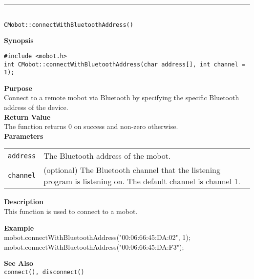 \noindent
\vspace{5pt}
\rule{4.5in}{0.015in} \\
\noindent
{\LARGE \texttt{CMobot::connectWithBluetoothAddress()}}\\
{}

\noindent
{\bf Synopsis}
\vspace{-8pt}
\begin{verbatim}
#include <mobot.h>
int CMobot::connectWithBluetoothAddress(char address[], int channel = 1);
\end{verbatim}

\noindent
{\bf Purpose}\\
Connect to a remote mobot via Bluetooth by specifying the specific Bluetooth
address of the device.\\

\noindent
{\bf Return Value}\\
The function returns 0 on success and non-zero otherwise.\\

\noindent
{\bf Parameters}
\vspace{-0.1in}
\begin{description}
\item               
\begin{tabular}{p{10 mm}p{145 mm}}
\texttt{address} & The Bluetooth address of the mobot. \\
\texttt{channel} & (optional) The Bluetooth channel that the listening program is
listening on. The default channel is channel 1. \\
\end{tabular}
\end{description}

\noindent
{\bf Description}\\
This function is used to connect to a mobot. 

\noindent
{\bf Example}\\
mobot.connectWithBluetoothAddress("00:06:66:45:DA:02", 1);
mobot.connectWithBluetoothAddress("00:06:66:45:DA:F3");
\noindent

\noindent
{\bf See Also}\\
\texttt{connect(), disconnect()}

